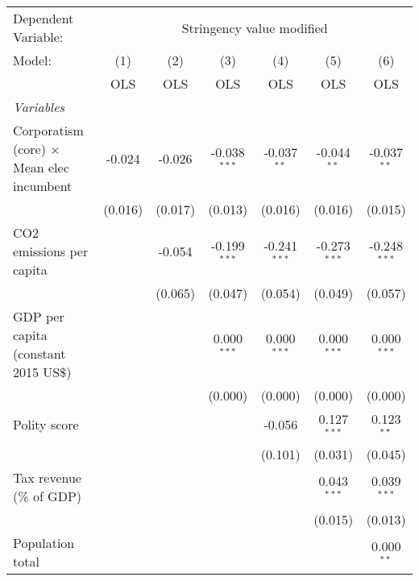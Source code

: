 
\begingroup
\centering
\begin{tabular}{lcccccc}
   \toprule
   Dependent Variable: & \multicolumn{6}{c}{Stringency value modified}\\
   Model:                                           & (1)     & (2)     & (3)            & (4)            & (5)            & (6)\\  
                                                    &  OLS    & OLS     & OLS            & OLS            & OLS            & OLS\\  
   \midrule
   \emph{Variables}\\
   Corporatism (core) $\times$ Mean elec incumbent  & -0.024  & -0.026  & -0.038$^{***}$ & -0.037$^{**}$  & -0.044$^{**}$  & -0.037$^{**}$\\   
                                                    & (0.016) & (0.017) & (0.013)        & (0.016)        & (0.016)        & (0.015)\\   
   CO2 emissions per capita                         &         & -0.054  & -0.199$^{***}$ & -0.241$^{***}$ & -0.273$^{***}$ & -0.248$^{***}$\\   
                                                    &         & (0.065) & (0.047)        & (0.054)        & (0.049)        & (0.057)\\   
   GDP per capita (constant 2015 US\$)              &         &         & 0.000$^{***}$  & 0.000$^{***}$  & 0.000$^{***}$  & 0.000$^{***}$\\   
                                                    &         &         & (0.000)        & (0.000)        & (0.000)        & (0.000)\\   
   Polity score                                     &         &         &                & -0.056         & 0.127$^{***}$  & 0.123$^{**}$\\   
                                                    &         &         &                & (0.101)        & (0.031)        & (0.045)\\   
   Tax revenue (\% of GDP)                          &         &         &                &                & 0.043$^{***}$  & 0.039$^{***}$\\   
                                                    &         &         &                &                & (0.015)        & (0.013)\\   
   Population total                                 &         &         &                &                &                & 0.000$^{**}$\\   

\end{tabular}
